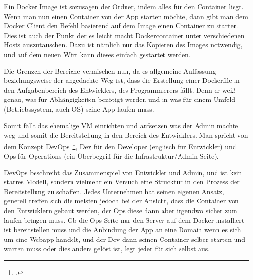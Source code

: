 Ein Docker Image ist sozusagen der Ordner, indem alles für den Container liegt. Wenn man nun einen Container von der App starten möchte, dann gibt man dem Docker Client den Befehl basierend auf dem Image einen Container zu starten.
Dies ist auch der Punkt der es leicht macht Dockercontainer unter verschiedenen Hosts auszutauschen. Dazu ist nämlich nur das Kopieren des Images notwendig, und auf dem neuen Wirt kann dieses einfach gestartet werden.

Die Grenzen der Bereiche vermischen nun, da es allgemeine Auffassung, beziehungsweise der angedachte Weg ist, dass die Erstellung einer Dockerfile in den Aufgabenbereich
des Entwicklers, des Programmierers fällt. Denn er weiß genau, was für Abhängigkeiten benötigt werden und in was für einem Umfeld (Betriebssystem, auch OS) seine App laufen muss.

Somit fällt das ehemalige VM einrichten und aufsetzen was der Admin machte weg und somit die Bereitstellung in den Bereich des Entwicklers.
Man spricht von dem Konzept DevOps~\footcite[Vgl. ][]{website:devops}, Dev für den Developer (englisch für Entwickler) und Ops für Operations (ein Überbegriff für die Infrastruktur/Admin Seite).

DevOps beschreibt das Zusammenspiel von Entwickler und Admin, und ist kein starres Modell, sondern vielmehr ein Versuch eine Strucktur in den Prozess der Bereitstellung zu schaffen.
Jedes Unternehmen hat seinen eigenen Ansatz, generell treffen sich die meisten jedoch bei der Ansicht, dass die Container von den Entwicklern gebaut werden, der Ops diese dann aber irgendwo sicher zum laufen bringen muss.
Ob die Ops Seite nur den Server auf dem Docker installiert ist bereitstellen muss und die Anbindung der App an eine Domain wenn es sich um eine Webapp handelt, und der Dev dann seinen Container selber starten und warten muss oder dies anders gelöst ist, legt jeder für sich selbst aus.
